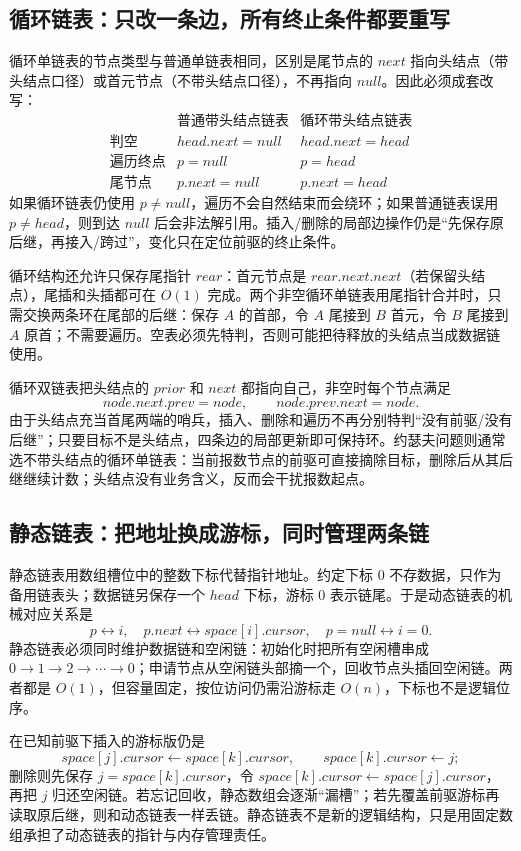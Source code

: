 \documentclass[UTF8,fontset=none,11pt,a4paper]{ctexart}
\begin{document}
\subsection{循环链表：只改一条边，所有终止条件都要重写}
循环单链表的节点类型与普通单链表相同，区别是尾节点的 $next$ 指向头结点（带头结点口径）或首元节点（不带头结点口径），不再指向 $null$。因此必须成套改写：
\[
\begin{array}{c|c|c}
&\text{普通带头结点链表}&\text{循环带头结点链表}\\\hline
\text{判空}&head.next=null&head.next=head\\
\text{遍历终点}&p=null&p=head\\
\text{尾节点}&p.next=null&p.next=head
\end{array}
\]
如果循环链表仍使用 $p\ne null$，遍历不会自然结束而会绕环；如果普通链表误用 $p\ne head$，则到达 $null$ 后会非法解引用。插入/删除的局部边操作仍是“先保存原后继，再接入/跨过”，变化只在定位前驱的终止条件。

循环结构还允许只保存尾指针 $rear$：首元节点是 $rear.next.next$（若保留头结点），尾插和头插都可在 $O(1)$ 完成。两个非空循环单链表用尾指针合并时，只需交换两条环在尾部的后继：保存 $A$ 的首部，令 $A$ 尾接到 $B$ 首元，令 $B$ 尾接到 $A$ 原首；不需要遍历。空表必须先特判，否则可能把待释放的头结点当成数据链使用。

循环双链表把头结点的 $prior$ 和 $next$ 都指向自己，非空时每个节点满足
\[
node.next.prev=node,\qquad node.prev.next=node.
\]
由于头结点充当首尾两端的哨兵，插入、删除和遍历不再分别特判“没有前驱/没有后继”；只要目标不是头结点，四条边的局部更新即可保持环。约瑟夫问题则通常选不带头结点的循环单链表：当前报数节点的前驱可直接摘除目标，删除后从其后继继续计数；头结点没有业务含义，反而会干扰报数起点。

\subsection{静态链表：把地址换成游标，同时管理两条链}
静态链表用数组槽位中的整数下标代替指针地址。约定下标 $0$ 不存数据，只作为备用链表头；数据链另保存一个 $head$ 下标，游标 $0$ 表示链尾。于是动态链表的机械对应关系是
\[
 p\leftrightarrow i,\quad p.next\leftrightarrow space[i].cursor,
 \quad p=null\leftrightarrow i=0.
\]
静态链表必须同时维护数据链和空闲链：初始化时把所有空闲槽串成 $0\to1\to2\to\cdots\to0$；申请节点从空闲链头部摘一个，回收节点头插回空闲链。两者都是 $O(1)$，但容量固定，按位访问仍需沿游标走 $O(n)$，下标也不是逻辑位序。

在已知前驱下插入的游标版仍是
\[
space[j].cursor\leftarrow space[k].cursor,\qquad space[k].cursor\leftarrow j;
\]
删除则先保存 $j=space[k].cursor$，令 $space[k].cursor\leftarrow space[j].cursor$，再把 $j$ 归还空闲链。若忘记回收，静态数组会逐渐“漏槽”；若先覆盖前驱游标再读取原后继，则和动态链表一样丢链。静态链表不是新的逻辑结构，只是用固定数组承担了动态链表的指针与内存管理责任。
\end{document}
